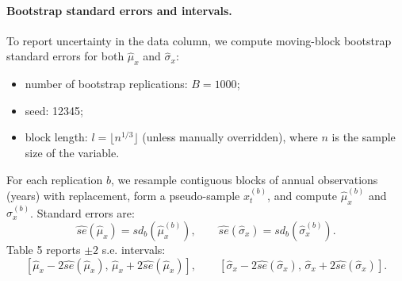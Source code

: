 \paragraph{Bootstrap standard errors and intervals.}
To report uncertainty in the data column, we compute moving-block bootstrap standard errors for both \(\widehat{\mu}_x\) and \(\widehat{\sigma}_x\):
\begin{itemize}
\item number of bootstrap replications: \(B=1000\);
\item seed: 12345;
\item block length: \(l=\lfloor n^{1/3}\rfloor\) (unless manually overridden), where \(n\) is the sample size of the variable.
\end{itemize}
For each replication \(b\), we resample contiguous blocks of annual observations (years) with replacement, form a pseudo-sample \(x_t^{(b)}\), and compute \(\widehat{\mu}_x^{(b)}\) and \(\widehat{\sigma}_x^{(b)}\). Standard errors are:
\[
\widehat{se}(\widehat{\mu}_x)=sd_b\!\left(\widehat{\mu}_x^{(b)}\right), \qquad
\widehat{se}(\widehat{\sigma}_x)=sd_b\!\left(\widehat{\sigma}_x^{(b)}\right).
\]
Table 5 reports \(\pm 2\) s.e. intervals:
\[
\left[\widehat{\mu}_x-2\widehat{se}(\widehat{\mu}_x),\,\widehat{\mu}_x+2\widehat{se}(\widehat{\mu}_x)\right], \qquad
\left[\widehat{\sigma}_x-2\widehat{se}(\widehat{\sigma}_x),\,\widehat{\sigma}_x+2\widehat{se}(\widehat{\sigma}_x)\right].
\]
